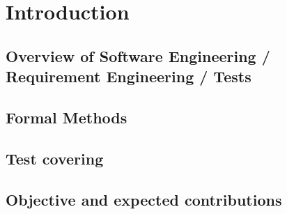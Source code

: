\chapter{Introduction}

\section{Overview of Software Engineering / Requirement Engineering / Tests}

\section{Formal Methods}

\section{Test covering}

\section{Objective and expected contributions}
